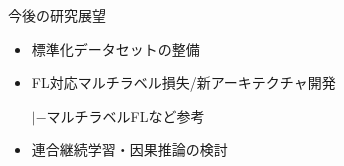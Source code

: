\documentclass[unicode,12pt,aspectratio=169,dvipdfmx]{beamer}
\begin{document}
\begin{frame}{今後の研究展望}
  \begin{itemize}
    \item 標準化データセットの整備
    \item FL対応マルチラベル損失/新アーキテクチャ開発

    $|-$マルチラベルFLなど参考
    \item 連合継続学習・因果推論の検討
  \end{itemize}
\end{frame}
\end{document}
